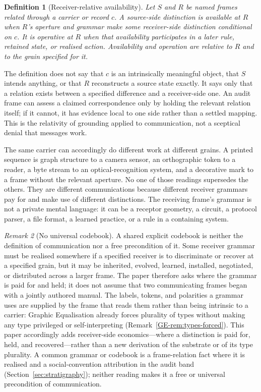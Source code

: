 \documentclass[11pt,a4paper]{article}
\newtheorem{definition}{Definition}[section]
\theoremstyle{remark}\newtheorem{remark}[definition]{Remark}
\begin{document}
\begin{definition}[Receiver-relative availability]\label{def:availability}
Let $S$ and $R$ be named frames related through a carrier or record $c$. A
source-side distinction is \emph{available at $R$} when $R$'s aperture and grammar
make some receiver-side distinction conditional on $c$. It is \emph{operative at
$R$} when that availability participates in a later rule, retained state, or
realised action. Availability and operation are relative to $R$ and to the grain
specified for it.
\end{definition}

The definition does not say that $c$ is an intrinsically meaningful object, that
$S$ intends anything, or that $R$ reconstructs a source state exactly. It says
only that a relation exists between a specified difference and a receiver-side
one. An audit frame can assess a claimed correspondence only by holding the
relevant relation itself; if it cannot, it has evidence local to one side rather
than a settled mapping. This is the relativity of grounding applied to
communication, not a sceptical denial that messages work.

The same carrier can accordingly do different work at different grains. A printed
sequence is graph structure to a camera sensor, an orthographic token to a reader,
a byte stream to an optical-recognition system, and a decorative mark to a frame
without the relevant aperture. No one of those readings supersedes the others.
They are different communications because different receiver grammars pay for and
make use of different distinctions. The receiving frame's grammar is not a
private mental language: it can be a receptor geometry, a circuit, a protocol
parser, a file format, a learned practice, or a rule in a containing system.

\begin{remark}[No universal codebook]\label{rem:no-universal-codebook}
A shared explicit codebook is neither the definition of communication nor a free
precondition of it. Some receiver grammar must be realised somewhere if a
specified receiver is to discriminate or recover at a specified grain, but it may
be inherited, evolved, learned, installed, negotiated, or distributed across a
larger frame. The paper therefore asks where the grammar is paid for and held; it
does not assume that two communicating frames began with a jointly authored
manual. The labels, tokens, and polarities a grammar uses are supplied by the
frame that reads them rather than being intrinsic to a carrier: Graphic
Equalisation already forces plurality of types without making any type privileged
or self-interpreting (Remark~\ref{GE-rem:types-forced}). This paper accordingly
adds receiver-side economics---where a distinction is paid for, held, and
recovered---rather than a new derivation of the substrate or of its type
plurality. A common grammar or codebook is a frame-relation fact where it is
realised and a social-convention attribution in the audit band
(Section~\ref{sec:stratigraphy}); neither reading makes it a free or universal
precondition of communication.
\end{remark}
\end{document}

